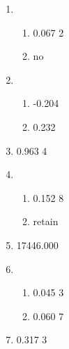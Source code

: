 \documentclass[12pt]{article}
\newcommand{\exnum}[9]{
  #1#2#3#4#5#6.#7#8#9\ignorespaces%
}
\newcommand{\exstring}[1]{
  #1%
}
\begin{document}
\begin{enumerate}









\end{enumerate}

\newpage

\begin{enumerate}
  \item 
   \begin{enumerate}
      \item \exnum{ }{ }{ }{ }{ }{0}{0}{6}{7}{2}\\
      \item \exstring{no} 
  \end{enumerate}
  \item 
   \begin{enumerate}
      \item \exnum{ }{ }{ }{ }{-}{0}{2}{0}{4}\\
      \item \exnum{ }{ }{ }{ }{ }{0}{2}{3}{2} 
  \end{enumerate}
  \item \exnum{ }{ }{ }{ }{ }{0}{9}{6}{3}{4}
  \item 
   \begin{enumerate}
      \item \exnum{ }{ }{ }{ }{ }{0}{1}{5}{2}{8}\\
      \item \exstring{retain} 
  \end{enumerate}
  \item \exnum{ }{1}{7}{4}{4}{6}{0}{0}{0}
  \item 
   \begin{enumerate}
      \item \exnum{ }{ }{ }{ }{ }{0}{0}{4}{5}{3}\\
      \item \exnum{ }{ }{ }{ }{ }{0}{0}{6}{0}{7} 
  \end{enumerate}
  \item \exnum{ }{ }{ }{ }{ }{0}{3}{1}{7}{3}
\end{enumerate}
\end{document}
